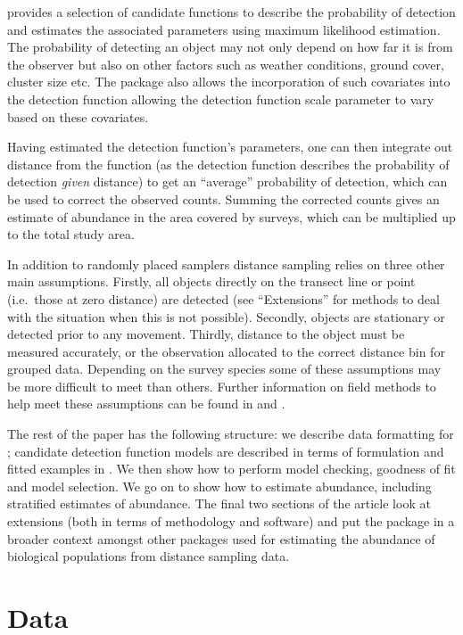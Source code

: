 \documentclass[article,shortnames]{jss}
\begin{document}
 provides a selection of candidate functions to describe
the probability of detection and estimates the associated parameters
using maximum likelihood estimation. The probability of detecting an
object may not only depend on how far it is from the observer but also
on other factors such as weather conditions, ground cover, cluster size
etc. The  package also allows the incorporation of such
covariates into the detection function allowing the detection function
scale parameter to vary based on these covariates.

Having estimated the detection function's parameters, one can then
integrate out distance from the function (as the detection function
describes the probability of detection \emph{given} distance) to get an
``average'' probability of detection, which can be used to correct the
observed counts. Summing the corrected counts gives an estimate of
abundance in the area covered by surveys, which can be multiplied up to
the total study area.

In addition to randomly placed samplers distance sampling relies on
three other main assumptions. Firstly, all objects directly on the
transect line or point (i.e.~those at zero distance) are detected (see
``Extensions'' for methods to deal with the situation when this is not
possible). Secondly, objects are stationary or detected prior to any
movement. Thirdly, distance to the object must be measured accurately,
or the observation allocated to the correct distance bin for grouped
data. Depending on the survey species some of these assumptions may be
more difficult to meet than others. Further information on field methods
to help meet these assumptions can be found in \citet{Buckland:2001vm}
and \citet{buckland2015distance}.

The rest of the paper has the following structure: we describe data
formatting for ; candidate detection function models are
described in terms of formulation and fitted examples in .
We then show how to perform model checking, goodness of fit and model
selection. We go on to show how to estimate abundance, including
stratified estimates of abundance. The final two sections of the article
look at extensions (both in terms of methodology and software) and put
the package in a broader context amongst other  packages
used for estimating the abundance of biological populations from
distance sampling data.

\section{Data}\label{data}
\end{document}
